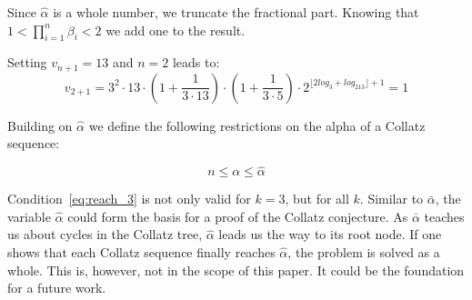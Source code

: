 \par\medskip
Since $\hat\alpha$ is a whole number, we truncate the fractional part. Knowing that $1<\prod_{i=1}^{n}\beta_i<2$ we add one to the result.

\bigskip
\begin{example}
Setting $v_{n+1}=13$ and $n=2$ leads to:
\[
v_{2+1}=3^2\cdot13\cdot\left(1+\frac{1}{3\cdot13}\right)\cdot\left(1+\frac{1}{3\cdot5}\right)\cdot2^{\lfloor2log_3+log_213\rfloor+1}=1
\]
\end{example}

Building on $\hat\alpha$ we define the following restrictions on the alpha of a Collatz sequence:

\begin{equation}
\label{eq:reach_3}
n\le\alpha\le\hat\alpha
\end{equation}

Condition~\ref{eq:reach_3} is not only valid for $k=3$, but for all $k$. Similar to $\bar\alpha$, the variable $\hat\alpha$ could form the basis for a proof of the Collatz conjecture. As $\bar\alpha$ teaches us about cycles in the Collatz tree, $\hat\alpha$ leads us the way to its root node. If one shows that each Collatz sequence finally reaches $\hat\alpha$, the problem is solved as a whole. This is, however, not in the scope of this paper. It could be the foundation for a future work.
